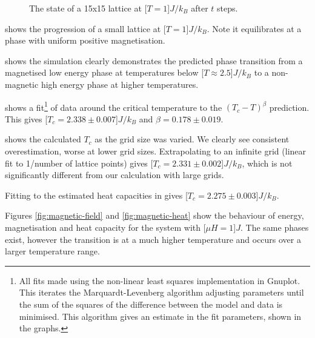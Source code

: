 \documentclass[12pt,a4paper,english]{article}
\begin{document}
\begin{figure}
\caption{The state of a 15x15 lattice at \unit[$T=1$]{$J/k_B$} after $t$ steps.}\label{fig:progress}
\end{figure}

 shows the progression of a small lattice at \unit[$T=1$]{$J/k_B$}. Note it equilibrates at a phase with uniform positive magnetisation.

 shows the simulation clearly demonstrates the predicted phase transition from a magnetised low energy phase at temperatures below \unit[$T\approx2.5$]{$J/k_B$} to a non-magnetic high energy phase at higher temperatures.

 shows a fit\footnote{All fits made using the non-linear least squares implementation in Gnuplot.  This iterates the Marquardt-Levenberg algorithm adjusting parameters until the sum of the squares of the difference between the model and data is minimised. This algorithm gives an estimate in the fit parameters, shown in the graphs.} of data around the critical temperature to the $\left( T_c - T\right)^\beta$ prediction.  This gives \unit[$T_c=2.338\pm0.007$]{$J/k_B$} and $\beta=0.178\pm0.019$.

 shows the calculated $T_c$ as the grid size  was varied. We clearly see consistent overestimation, worse at lower grid sizes. Extrapolating to an infinite grid (linear fit to 1/number of lattice points) gives \unit[$T_c=2.331\pm0.002$]{$J/k_B$}, which is not significantly different from our calculation with large grids.

Fitting  to the estimated heat capacities in  gives \unit[$T_c=2.275\pm0.003$]{$J/k_B$}.

Figures \ref{fig:magnetic-field} and \ref{fig:magnetic-heat} show the behaviour of energy, magnetisation and heat capacity for the system with \unit[$\mu H = 1$]{$J$}. The same phases exist, however the transition is at a much higher temperature and occurs over a larger temperature range.
\end{document}
